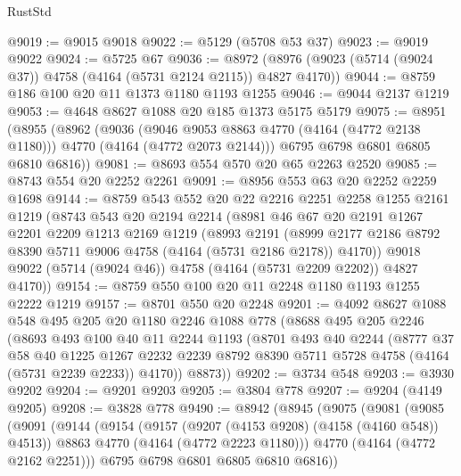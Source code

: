 \begin{lexlean}{RustStd}
\begin{coremodule}
@9019 := @9015 @9018
@9022 := @5129 (@5708 @53 @37)
@9023 := @9019 @9022
@9024 := @5725 @67
@9036 := @8972 (@8976 (@9023 (@5714 (@9024 @37)) @4758 (@4164 (@5731 @2124 @2115)) @4827 @4170))
@9044 := @8759 @186 @100 @20 @11 @1373 @1180 @1193 @1255
@9046 := @9044 @2137 @1219
@9053 := @4648 @8627 @1088 @20 @185 @1373 @5175 @5179
@9075 := @8951
    (@8955
      (@8962
        (@9036
          (@9046 @9053 @8863 @4770 (@4164 (@4772 @2138 @1180)))
          @4770
          (@4164 (@4772 @2073 @2144)))
        @6795
        @6798
        @6801
        @6805
        @6810
        @6816))
@9081 := @8693 @554 @570 @20 @65 @2263 @2520
@9085 := @8743 @554 @20 @2252 @2261
@9091 := @8956 @553 @63 @20 @2252 @2259 @1698
@9144 := @8759
    @543
    @552
    @20
    @22
    @2216
    @2251
    @2258
    @1255
    @2161
    @1219
    (@8743
      @543
      @20
      @2194
      @2214
      (@8981
        @46
        @67
        @20
        @2191
        @1267
        @2201
        @2209
        @1213
        @2169
        @1219
        (@8993
          @2191
          (@8999 @2177 @2186 @8792 @8390 @5711 @9006 @4758 (@4164 (@5731 @2186 @2178)) @4170))
        @9018
        @9022
        (@5714 (@9024 @46))
        @4758
        (@4164 (@5731 @2209 @2202))
        @4827
        @4170))
@9154 := @8759 @550 @100 @20 @11 @2248 @1180 @1193 @1255 @2222 @1219
@9157 := @8701 @550 @20 @2248
@9201 := @4092
    @8627
    @1088
    @548
    @495
    @205
    @20
    @1180
    @2246
    @1088
    @778
    (@8688
      @495
      @205
      @2246
      (@8693
        @493
        @100
        @40
        @11
        @2244
        @1193
        (@8701
          @493
          @40
          @2244
          (@8777
            @37
            @58
            @40
            @1225
            @1267
            @2232
            @2239
            @8792
            @8390
            @5711
            @5728
            @4758
            (@4164 (@5731 @2239 @2233))
            @4170))
        @8873))
@9202 := @3734 @548
@9203 := @3930 @9202
@9204 := @9201 @9203
@9205 := @3804 @778
@9207 := @9204 (@4149 @9205)
@9208 := @3828 @778
@9490 := @8942
    (@8945
      (@9075
        (@9081
          (@9085
            (@9091
              (@9144
                (@9154
                  (@9157 (@9207 (@4153 @9208) (@4158 (@4160 @548)) @4513))
                  @8863
                  @4770
                  (@4164 (@4772 @2223 @1180)))
                @4770
                (@4164 (@4772 @2162 @2251)))
              @6795
              @6798
              @6801
              @6805
              @6810
              @6816))

\end{coremodule}
\end{lexlean}
